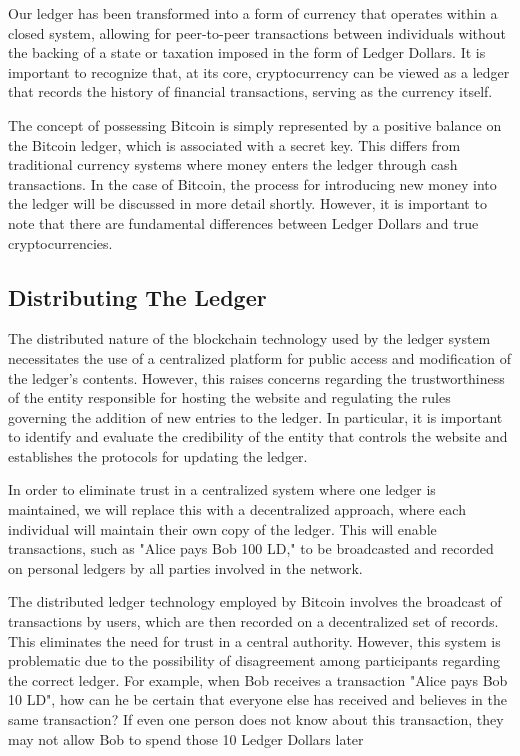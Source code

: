 Our ledger has been transformed into a form of currency that operates within a closed system, allowing for peer-to-peer transactions between individuals without the backing of a state or taxation imposed in the form of Ledger Dollars. It is important to recognize that, at its core, cryptocurrency can be viewed as a ledger that records the history of financial transactions, serving as the currency itself.

%

The concept of possessing Bitcoin is simply represented by a positive balance on the Bitcoin ledger, which is associated with a secret key. This differs from traditional currency systems where money enters the ledger through cash transactions. In the case of Bitcoin, the process for introducing new money into the ledger will be discussed in more detail shortly. However, it is important to note that there are fundamental differences between Ledger Dollars and true cryptocurrencies.

\subsection{Distributing The Ledger}
The distributed nature of the blockchain technology used by the ledger system necessitates the use of a centralized platform for public access and modification of the ledger's contents. However, this raises concerns regarding the trustworthiness of the entity responsible for hosting the website and regulating the rules governing the addition of new entries to the ledger. In particular, it is important to identify and evaluate the credibility of the entity that controls the website and establishes the protocols for updating the ledger.

In order to eliminate trust in a centralized system where one ledger is maintained, we will replace this with a decentralized approach, where each individual will maintain their own copy of the ledger. This will enable transactions, such as "Alice pays Bob 100 LD," to be broadcasted and recorded on personal ledgers by all parties involved in the network.

The distributed ledger technology employed by Bitcoin involves the broadcast of transactions by users, which are then recorded on a decentralized set of records. This eliminates the need for trust in a central authority. However, this system is problematic due to the possibility of disagreement among participants regarding the correct ledger. For example, when Bob receives a transaction "Alice pays Bob 10 LD", how can he be certain that everyone else has received and believes in the same transaction? If even one person does not know about this transaction, they may not allow Bob to spend those 10 Ledger Dollars later

